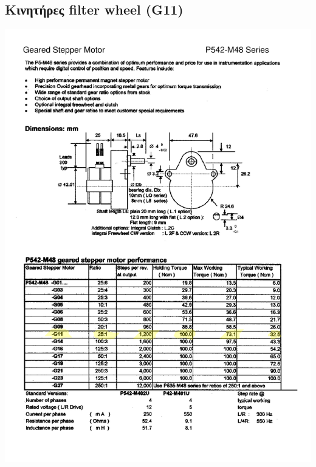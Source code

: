 \documentclass[
  a4paper,
  twoside,
  titlepage,
  11pt]{article}
\numberwithin{equation}{section}
\numberwithin{figure}{section}
\numberwithin{table}{section}
\begin{document}
\hypertarget{ux3baux3b9ux3bdux3b7ux3c4ux3aeux3c1ux3b5ux3c2-filter-wheel-g11}{%
\subsection{Κινητήρες filter wheel (G11)}\label{ux3baux3b9ux3bdux3b7ux3c4ux3aeux3c1ux3b5ux3c2-filter-wheel-g11}}

\begin{center}\includegraphics[width=1\linewidth]{./files/FWmotor} \end{center}
\end{document}
